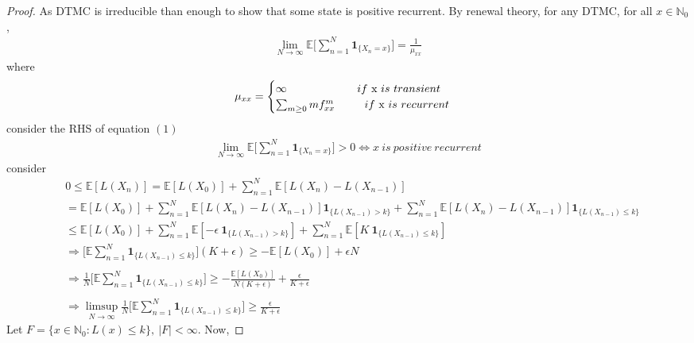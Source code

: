 \documentclass[a4paper,10pt,english]{article}
\begin{document}
\begin{proof}
As DTMC is irreducible than enough to show that some state is positive recurrent.
By renewal theory, for any DTMC, for all $x \in \mathbb{N}_0$,
\begin{align}
\lim\limits_{N \rightarrow \infty} \mathbb{E}\Big[ \sum_{n=1}^{N} \boldsymbol{1}_{\{X_n=x\}} \Big] = \frac{1}{\mu _{xx}} 
\end{align}
where 
\begin{equation*}
\mu _{xx}=
\begin{cases}
	\infty \ \ \ \ \ \ \ \ \ \ \ \ \ \ \ \ \ \ \ if \ $x$ \ is \ transient\\
	\sum_{m \geq 0}m f^{m}_{xx} \ \ \ \ \ \ \ \ if \ $x$ \ is \ recurrent \\
\end{cases}
\end{equation*}
consider the RHS of equation $(1)$
\begin{align*}
\lim\limits_{N \rightarrow \infty} \mathbb{E}\Big[ \sum_{n=1}^{N} \boldsymbol{1}_{\{X_n=x\}} \Big] > 0 \Longleftrightarrow x \ is \ positive \ recurrent  
\end{align*}
consider
\begin{align*}
& 0 \leq \mathbb{E}[L(X_n)] = \mathbb{E}[L(X_0)] +   \sum_{n=1}^{N}\mathbb{E}[L(X_n)-L(X_{n-1})]\\
&= \mathbb{E}[L(X_0)] + \sum_{n=1}^{N}\mathbb{E}[L(X_n)-L(X_{n-1})]\boldsymbol{1}_{\{L(X_{n-1})>k\}} + \sum_{n=1}^{N}\mathbb{E}[L(X_n)-L(X_{n-1})]\boldsymbol{1}_{\{L(X_{n-1})\leq k\}}\\
&\leq \mathbb{E}[L(X_0)] + \sum_{n=1}^{N}\mathbb{E}[-\epsilon \        \boldsymbol{1}_{\{L(X_{n-1})>k\}}] + \sum_{n=1}^{N}\mathbb{E}[K \ \boldsymbol{1}_{\{L(X_{n-1})\leq k\}}]\\
&\Rightarrow \Bigg[\mathbb{E}\sum_{n=1}^{N} \boldsymbol{1}_{\{L(X_{n-1})\leq k\}}\Bigg](K + \epsilon) \geq -\mathbb{E}[L(X_0)] + \epsilon N\\\\
&\Rightarrow \frac{1}{N} \Bigg[\mathbb{E}\sum_{n=1}^{N} \boldsymbol{1}_{\{L(X_{n-1})\leq k\}}\Bigg] \geq -\frac{\mathbb{E}[L(X_0)]}{N(K+\epsilon)} + \frac{\epsilon}{K+\epsilon}\\\\
&\Rightarrow \limsup_{N\rightarrow \infty}\frac{1}{N} \Bigg[\mathbb{E}\sum_{n=1}^{N} \boldsymbol{1}_{\{L(X_{n-1})\leq k\}}\Bigg] \geq \frac{\epsilon}{K+\epsilon}
\end{align*}
Let $F = \{x \in \mathbb{N}_0: L(x) \leq k\}, \ |F| < \infty$. Now,

\end{proof}
\end{document}
